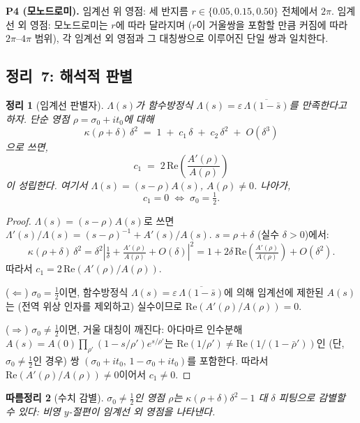 \documentclass[11pt, a4paper]{article}
\theoremstyle{plain}
\newtheorem{theorem}{정리}
\newtheorem{corollary}[theorem]{따름정리}
\theoremstyle{definition}
\newcommand{\abs}[1]{\left|#1\right|}
\begin{document}
\medskip
\noindent\textbf{P4 (모노드로미).} 임계선 위 영점: 세 반지름
$r\in\{0.05, 0.15, 0.50\}$ 전체에서 $2\pi$.
임계선 외 영점: 모노드로미는 $r$에 따라 달라지며
($r$이 거울쌍을 포함할 만큼 커짐에 따라 $2\pi$--$4\pi$ 범위),
각 임계선 외 영점과 그 대칭쌍으로 이루어진 단일 쌍과 일치한다.


\subsection{정리~7: 해석적 판별}
\label{ssec:thm7}

\begin{theorem}[임계선 판별자]
\label{thm:disc}
  $\Lambda(s)$가 함수방정식
  $\Lambda(s)=\varepsilon\,\overline{\Lambda(1-\bar{s})}$를
  만족한다고 하자. 단순 영점 $\rho=\sigma_{0}+it_{0}$에 대해
  \[
    \kappa(\rho+\delta)\,\delta^{2}
    \;=\; 1 \;+\; c_{1}\,\delta \;+\; c_{2}\,\delta^{2} \;+\; O(\delta^{3})
  \]
  으로 쓰면,
  \[
    c_{1} \;=\; 2\,\mathrm{Re}\!\left(\frac{A'(\rho)}{A(\rho)}\right)
  \]
  이 성립한다. 여기서 $\Lambda(s)=(s-\rho)A(s)$, $A(\rho)\neq 0$.
  나아가,
  \[
    \boxed{c_{1} = 0 \;\iff\; \sigma_{0} = \tfrac{1}{2}.}
  \]
\end{theorem}

\begin{proof}
  $\Lambda(s)=(s-\rho)A(s)$로 쓰면
  $\Lambda'(s)/\Lambda(s) = (s-\rho)^{-1}+A'(s)/A(s)$.
  $s=\rho+\delta$ (실수 $\delta>0$)에서:
  \[
    \kappa(\rho+\delta)\,\delta^{2}
    = \delta^{2}\abs{\tfrac{1}{\delta} + \tfrac{A'(\rho)}{A(\rho)}+O(\delta)}^{2}
    = 1 + 2\delta\,\mathrm{Re}\!\left(\tfrac{A'(\rho)}{A(\rho)}\right) + O(\delta^{2}).
  \]
  따라서 $c_{1}=2\,\mathrm{Re}(A'(\rho)/A(\rho))$.

  \medskip\noindent
  ($\Leftarrow$) $\sigma_{0}=\tfrac{1}{2}$이면,
  함수방정식 $\Lambda(s)=\varepsilon\,\overline{\Lambda(1-\bar{s})}$에 의해
  임계선에 제한된 $A(s)$는 (전역 위상 인자를 제외하고) 실수이므로
  $\mathrm{Re}(A'(\rho)/A(\rho))=0$.

  \medskip\noindent
  ($\Rightarrow$) $\sigma_{0}\neq\tfrac{1}{2}$이면,
  거울 대칭이 깨진다: 아다마르 인수분해
  $A(s)=A(0)\prod_{\rho'}(1-s/\rho')e^{s/\rho'}$는
  $\mathrm{Re}(1/\rho')\neq\mathrm{Re}(1/(1-\bar{\rho}'))$인
  (단, $\sigma_{0}\neq\tfrac{1}{2}$인 경우)
  쌍 $(\sigma_{0}+it_{0},\,1-\sigma_{0}+it_{0})$를 포함한다.
  따라서 $\mathrm{Re}(A'(\rho)/A(\rho))\neq 0$이어서 $c_{1}\neq 0$.
\end{proof}

\begin{corollary}[수치 감별]
  $\sigma_{0}\neq\tfrac{1}{2}$인 영점 $\rho$는
  $\kappa(\rho+\delta)\delta^{2}-1$ 대 $\delta$ 피팅으로 감별할 수 있다:
  비영 $y$-절편이 임계선 외 영점을 나타낸다.
\end{corollary}
\end{document}
